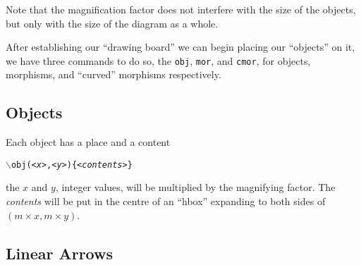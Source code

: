 \documentclass{europroc}
\begin{document}

Note that the magnification factor does not interfere with the size of
the objects, but only with the size of the diagram as a whole.

After establishing our ``drawing board'' we can begin placing our
``objects'' on it, we have three commands to do so, the {\tt obj},
{\tt mor}, and {\tt cmor}, for objects, morphisms, and ``curved''
morphisms respectively.


\subsection{Objects}

Each object has a place and a content

\begin{alltt}
  \(\backslash\)obj({\em<x>},{\em<y>})\{{\em<contents>}\}
\end{alltt}
the $x$ and $y$, integer values, will be multiplied by the magnifying
factor. The {\em contents} will be put in the centre of an ``hbox''
expanding to both sides of $(m\times x,m\times y)$.


\subsection{Linear Arrows}
\end{document}
